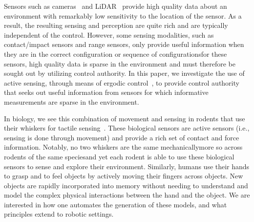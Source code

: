 \documentclass[conference]{IEEEtran}
\begin{document}
Sensors such as cameras~\cite{georgakisRSS17objectdetection, hengAutRob15calibrationVisualSLAM, nuger2016multicamera} and LiDAR~\cite{schwarz2010lidar, rasshofer2005automotive} provide high quality data about an environment with remarkably low sensitivity to the location of the sensor.
As a result, the resulting sensing and perception are quite rich and are typically independent of the control.
However, some sensing modalities, such as contact/impact sensors and range sensors, only provide useful information when they are in the correct configuration or sequence of configurations\textemdash for these sensors, high quality data is sparse in the environment and must therefore be sought out by utilizing control authority.
In this paper, we investigate the use of active sensing, through means of ergodic control~\cite{miller2016ergodic, miller2015optimalrange, mavrommati2017eSAC}, to provide control authority that seeks out useful information from sensors for which informative measurements are sparse in the environment.



In biology, we see this combination of movement and sensing in rodents that use their whiskers for tactile sensing~\cite{guic1989rats,carvell1990biometric,hobbs2015spatiotemporal, mitchinson2007feedback}. 
These biological sensors are active sensors (i.e., sensing is done through movement) and provide a rich set of contact and force information. 
Notably, no two whiskers are the same mechanically\textemdash more so across rodents of the same species\textemdash and yet each rodent is able to use these biological sensors to sense and explore their environment.
Similarly, humans use their hands to grasp and to feel objects by actively moving their fingers across objects.
New objects are rapidly incorporated into memory without needing to understand and model the complex physical interactions between the hand and the object. 
We are interested in how one automates the generation of these models, and what principles extend to robotic settings.
\end{document}
